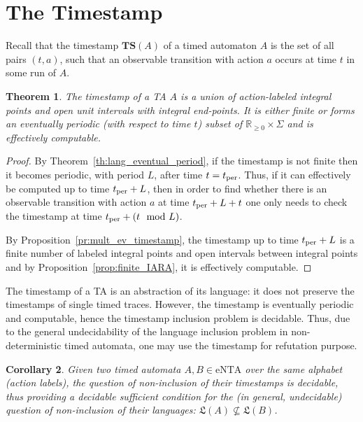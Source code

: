 \documentclass[11pt]{amsart}
\newtheorem{theorem}{Theorem}[section]
\newtheorem{corollary}[theorem]{Corollary}
\theoremstyle{definition}
\newcommand{\LLL}{\mathfrak{L}}
\newcommand{\TTTSSS}{\mathbf{TS}}
\newcommand{\ntaeps}{\mathrm{eNTA}}
\newcommand{\Actions}{\Sigma}
\newcommand{\PReals}{\mathbb{R}_{\geq 0}}
\begin{document}
\section{The Timestamp}
\label{sec:timestamp}
Recall that the timestamp $\TTTSSS(A)$ of a timed automaton $A$ is the set of all pairs $(t,a)$, such that an observable transition with action $a$ occurs at time $t$ in some run of $A$.
\begin{theorem}
\label{th:timestamp_eventual_period}
The timestamp of a TA $A$ is a union of action-labeled integral points and open unit intervals with integral end-points.
It is either finite or forms an eventually periodic (with respect to time $t$) subset of $\PReals \times \Actions$ and is effectively computable.
\end{theorem}
\begin{proof}
	By Theorem~\ref{th:lang_eventual_period}, if the timestamp is not finite then it becomes periodic, with period $L$, after time $t = t_\textnormal{per}$.
	Thus, if it can effectively be computed up to time $t_\textnormal{per}+L$, then in order to find whether there is an observable transition with action $a$ at time $t_\textnormal{per}+L+t$ one only needs to check the timestamp at time $t_\textnormal{per}+ (t \mod L)$.
	
	By Proposition~\ref{pr:mult_ev_timestamp}, the timestamp up to time $t_\textnormal{per}+L$ is a finite number of labeled integral points and open intervals between integral points and by Proposition~\ref{prop:finite_IARA}, it is effectively computable.	
\end{proof}


The timestamp of a TA is an abstraction of its language: it does not preserve the timestamps of single timed traces.
However, the timestamp is eventually periodic and computable, hence the timestamp inclusion problem is decidable.
Thus, due to the general undecidability of the language inclusion problem in non-deterministic timed automata, one may use the timestamp for refutation purpose.
\begin{corollary}
Given two timed automata $A,B \in \ntaeps$ over the same alphabet (action labels), the question of non-inclusion of their timestamps is decidable, 
thus providing a decidable sufficient condition for the (in general, undecidable) question of non-inclusion of their languages: $\LLL(A) \nsubseteq \LLL(B)$.
\end{corollary}
\end{document}

